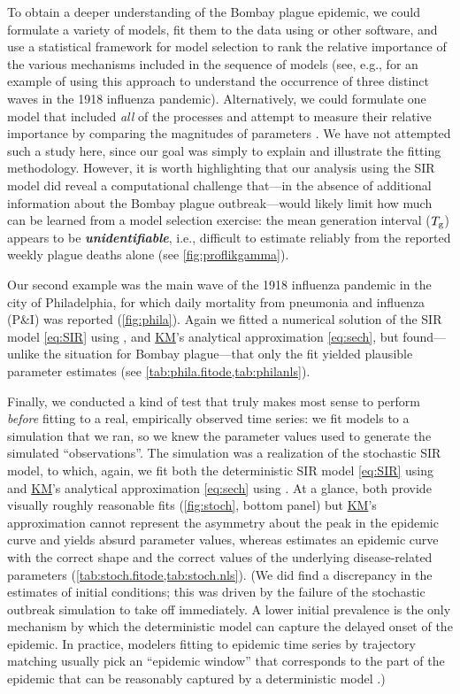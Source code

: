 \documentclass[]{interact}\usepackage[]{graphicx}\usepackage[]{xcolor}
\theoremstyle{plain}%
\theoremstyle{definition}
\theoremstyle{remark}
\newcommand{\term}[1]{{\bfseries\slshape#1}}
\newcommand{\Tg}{T_{\rm g}}
\newcommand{\KM}{\protect\hyperlink{cite.KermMcKe27}{KM}\xspace}
\newcommand{\code}[1]{\texttt{\detokenize{#1}}}
\begin{document}
To obtain a deeper understanding of the Bombay plague epidemic, we
could formulate a variety of models, fit them to the data using
\code{fitode} or other software, and use a statistical framework for
model selection \citep{BurnAnde02} to rank the relative importance
of the various mechanisms included in the sequence of models (see,
e.g., \citet{He+13a} for an example of using this
approach to understand the occurrence of three distinct waves in the
1918 influenza pandemic). Alternatively, we could formulate one model
that included \emph{all} of the processes and attempt to measure
their relative importance by comparing the magnitudes of parameters
\citep{Bolk23}.
We have not attempted such a study here, since our goal was simply to
explain and illustrate the fitting methodology.  However, it is worth
highlighting that our analysis using the SIR model did reveal a
computational challenge that---in the absence of additional
information about the Bombay plague outbreak---would likely limit how
much can be learned from a model selection exercise: the mean
generation interval ($\Tg$) appears to be \term{unidentifiable}, i.e.,
difficult to estimate reliably from the reported weekly plague deaths
alone (see \cref{fig:proflikgamma}).

Our second example was the main wave of the 1918 influenza pandemic in
the city of Philadelphia, for which daily mortality from pneumonia and
influenza (P\&I) was reported (\cref{fig:phila}).  Again we fitted a
numerical solution of the SIR model \eqref{eq:SIR} using \code{fitode},
and \KM's analytical approximation \eqref{eq:sech}, but found---unlike
the situation for Bombay plague---that only the \code{fitode} fit
yielded plausible parameter estimates (see
\cref{tab:phila.fitode,tab:philanls}).

Finally, we conducted a kind of test that truly makes most sense to
perform \emph{before} fitting to a real, empirically observed time
series: we fit models to a simulation that we ran, so we knew the
parameter values used to generate the simulated ``observations''.  The
simulation was a realization of the stochastic SIR model, to which,
again, we fit both the deterministic SIR model \eqref{eq:SIR} using
\code{fitode} and \KM's analytical approximation \eqref{eq:sech} using
\code{nls}.  At a glance, both provide visually roughly reasonable fits
(\cref{fig:stoch}, bottom panel) but \KM's approximation cannot
represent the asymmetry about the peak in the epidemic curve and
yields absurd
parameter values, whereas \code{fitode} estimates an epidemic curve
with the correct shape
and the correct values
of the underlying disease-related parameters
(\cref{tab:stoch.fitode,tab:stoch.nls}).  (We did find a discrepancy
in the estimates of initial conditions; this was driven by the failure
of the stochastic outbreak simulation to take off immediately.  A
lower initial prevalence is the only mechanism by which the
deterministic model can capture the delayed onset of the epidemic.  In
practice, modelers fitting to epidemic time series by trajectory
matching usually pick an ``epidemic window'' that corresponds to the
part of the epidemic that can be reasonably captured by a
deterministic model \citep{Earn+20}.)
\end{document}
